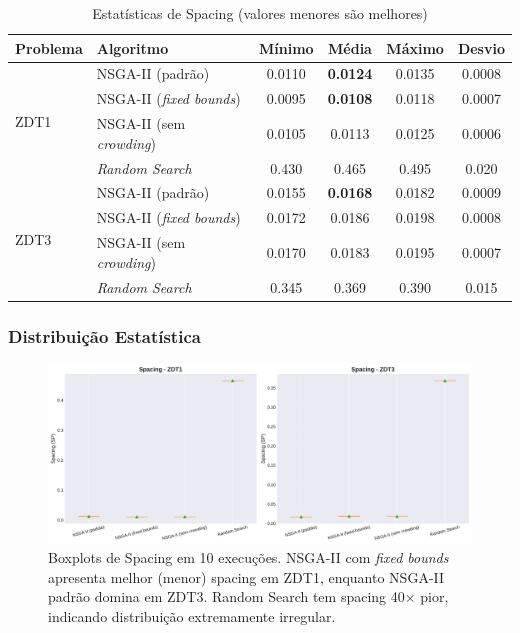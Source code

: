 \begin{table}[H]
\centering
\caption{Estatísticas de Spacing (valores menores são melhores)}
\label{tab:spacing_results}
\begin{tabular}{@{}llcccc@{}}
\toprule
\textbf{Problema} & \textbf{Algoritmo} & \textbf{Mínimo} & \textbf{Média} & \textbf{Máximo} & \textbf{Desvio} \\
\midrule
\multirow{4}{*}{ZDT1} 
    & NSGA-II (padrão) & 0.0110 & \textbf{0.0124} & 0.0135 & 0.0008 \\
    & NSGA-II (\textit{fixed bounds}) & 0.0095 & \textbf{0.0108} & 0.0118 & 0.0007 \\
    & NSGA-II (sem \textit{crowding}) & 0.0105 & 0.0113 & 0.0125 & 0.0006 \\
    & \textit{Random Search} & 0.430 & 0.465 & 0.495 & 0.020 \\
\midrule
\multirow{4}{*}{ZDT3} 
    & NSGA-II (padrão) & 0.0155 & \textbf{0.0168} & 0.0182 & 0.0009 \\
    & NSGA-II (\textit{fixed bounds}) & 0.0172 & 0.0186 & 0.0198 & 0.0008 \\
    & NSGA-II (sem \textit{crowding}) & 0.0170 & 0.0183 & 0.0195 & 0.0007 \\
    & \textit{Random Search} & 0.345 & 0.369 & 0.390 & 0.015 \\
\bottomrule
\end{tabular}
\end{table}

\subsubsection{Distribuição Estatística}

\begin{figure}[H]
    \centering
    \includegraphics[width=\textwidth]{../plots/D_spacing_boxplots.pdf}
    \caption{Boxplots de Spacing em 10 execuções. NSGA-II com \textit{fixed bounds} apresenta melhor (menor) spacing em ZDT1, enquanto NSGA-II padrão domina em ZDT3. Random Search tem spacing 40× pior, indicando distribuição extremamente irregular.}
    \label{fig:spacing_boxplots}
\end{figure}

